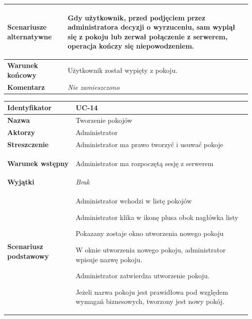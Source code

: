 {\begin{tabular}{ | l | l | }
	\hline
		\textbf{Scenariusze alternatywne} & \parbox[t]
		{11cm}{
			\begin{enumreq}
				\item Gdy użytkownik, przed podjęciem przez administratora decyzji o
				wyrzuceniu, sam wypiął się z pokoju lub zerwał połączenie z serwerem,
				operacja kończy się niepowodzeniem.
			\end{enumreq}
		}
		\\

	\hline
		\textbf{Warunek końcowy} & \parbox[t]{11cm}{
			Użytkownik został wypięty z pokoju.
		}
		\\

	\hline
		\textbf{Komentarz} & \parbox[t]{11cm}{
			\textit{Nie zamieszczono}
		}
		\\

	\hline
\end{tabular}

\vspace{2em}

\begin{tabular}{ | l | l | }
	\hline
		\textbf{Identyfikator} &
		UC-14
		\\

	\hline
		\textbf{Nazwa} &
		Tworzenie pokojów
		\\

	\hline
		\textbf{Aktorzy} & \parbox[t]{11cm}{
			Administrator
		}\\

	\hline
		\textbf{Streszczenie} & \parbox[t]{11cm}{
			Administrator ma prawo tworzyć i usuwać pokoje

		}\\

	\hline
		\textbf{Warunek wstępny} & \parbox[t]{11cm}{
			\begin{enumreq}
				\item Administrator ma rozpoczętą sesję z serwerem
			\end{enumreq}

		}
		\\

	\hline
		\textbf{Wyjątki} & \parbox[t]{11cm}{
			\textit{Brak}

		}
		\\

	\hline
		\textbf{Scenariusz podstawowy} & \parbox[t]{11cm}{
			\begin{enumreq}
				\item Administrator wchodzi w listę pokojów
				\item Administrator klika w ikonę plusa obok nagłówka listy
				\item Pokazany zostaje okno utworzenia nowego pokoju
				\item W oknie utworzenia nowego pokoju, administrator wpisuje nazwę
				pokoju.
				\item Administrator zatwierdza utworzenie pokoju.
				\item Jeżeli nazwa pokoju jest prawidłowa pod względem wymagań
				biznesowych, tworzony jest nowy pokój.
			\end{enumreq}
		}
		\\


\end{tabular}}
